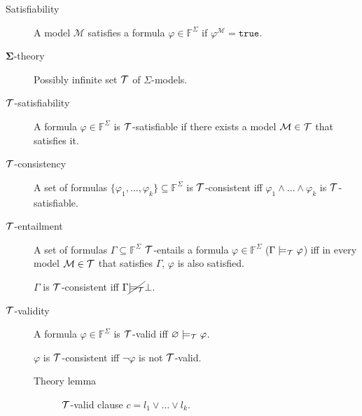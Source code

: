 \begin{description}
    \item[Satisfiability] 
        A model $\mathcal{M}$ satisfies a formula $\varphi \in \mathbb{F}^\Sigma$ if $\varphi^\mathcal{M} = \texttt{true}$.

    \item[$\mathbf{\Sigma}$-theory] 
        Possibly infinite set $\mathcal{T}$ of $\Sigma$-models.

    \item[$\mathbf{\mathcal{T}}$-satisfiability] 
        A formula $\varphi \in \mathbb{F}^\Sigma$ is $\mathcal{T}$-satisfiable if there exists a model $\mathcal{M} \in \mathcal{T}$ that satisfies it.

    \item[$\mathbf{\mathcal{T}}$-consistency] 
        A set of formulas $\{ \varphi_1, \dots, \varphi_k \} \subseteq \mathbb{F}^\Sigma$ is $\mathcal{T}$-consistent iff 
        $\varphi_1 \land \dots \land \varphi_k$ is $\mathcal{T}$-satisfiable.

    \item[$\mathbf{\mathcal{T}}$-entailment] 
        A set of formulas $\Gamma \subseteq \mathbb{F}^\Sigma$ $\mathcal{T}$-entails a formula $\varphi \in \mathbb{F}^\Sigma$ ($\Gamma \models_{\mathcal{T}} \varphi$) iff
        in every model $\mathcal{M} \in \mathcal{T}$ that satisfies $\Gamma$, $\varphi$ is also satisfied.

        \begin{remark}
            $\Gamma$ is $\mathcal{T}$-consistent iff $\Gamma \cancel{\models_{\mathcal{T}}} \bot$.
        \end{remark}

    \item[$\mathbf{\mathcal{T}}$-validity] 
        A formula $\varphi \in \mathbb{F}^\Sigma$ is $\mathcal{T}$-valid iff $\varnothing \models_{\mathcal{T}} \varphi$.

        \begin{remark}
            $\varphi$ is $\mathcal{T}$-consistent iff $\lnot\varphi$ is not $\mathcal{T}$-valid.
        \end{remark}

        \begin{description}
            \item[Theory lemma] 
                $\mathcal{T}$-valid clause $c = l_1 \vee \dots \vee l_k$.
        \end{description}


\end{description}
